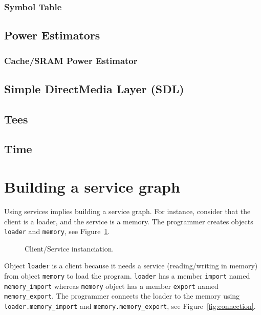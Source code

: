 \subsubsection{Symbol Table}

\subsection{Power Estimators}

\subsubsection{Cache/SRAM Power Estimator}

\subsection{Simple DirectMedia Layer (SDL)}

\subsection{Tees}

\subsection{Time}

\section{Building a service graph}
\label{building_a_service_graph}

Using services implies building a service graph.
For instance, consider that the client is a loader, and the service is a memory.
The programmer creates objects \texttt{loader} and \texttt{memory}, see Figure~\ref{fig:instanciation}.

\begin{figure}[h]
  \begin{center}
    
    \caption{\label{fig:instanciation} Client/Service instanciation.}
  \end{center}
\end{figure}

Object \texttt{loader} is a client because it needs a service (reading/writing in memory) from object \texttt{memory} to load the program.
\texttt{loader} has a member \texttt{import} named \texttt{memory\_import} whereas \texttt{memory} object has a member \texttt{export} named \texttt{memory\_export}.
The programmer connects the loader to the memory using \texttt{loader.memory\_import} and \texttt{memory.memory\_export}, see Figure~\ref{fig:connection}.

